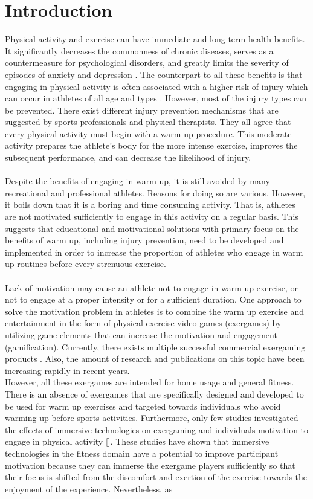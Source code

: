 \chapter{Introduction}
\label{chap:intro}
Physical activity and exercise can have immediate and long-term health benefits. It significantly decreases the commonness of chronic diseases, serves as a countermeasure for psychological disorders, and greatly limits the severity of episodes of anxiety and depression \cite{mayr2015prevention, warburton2006health}. The counterpart to all these benefits is that engaging in physical activity is often associated with a higher risk of injury which can occur in athletes of all age and types \cite{van1997severity}. However, most of the injury types can be prevented. There exist different injury prevention mechanisms that are suggested by sports professionals and physical therapists. They all agree that every physical activity must begin with a warm up procedure.  This moderate activity prepares the athlete's body for the more intense exercise, improves the subsequent performance, and can decrease the likelihood of injury. \\\\Despite the benefits of engaging in warm up, it is still avoided by many recreational and professional athletes. Reasons for doing so are various. However, it boils down that it is a boring and time consuming activity. That is, athletes are not motivated sufficiently to engage in this activity on a regular basis. This suggests that educational and motivational solutions with primary focus on the benefits of warm up, including injury prevention, need to be developed and implemented in order to increase the proportion of athletes who engage in warm up routines before every strenuous exercise.\\\\  Lack of motivation may cause an athlete not to engage in warm up exercise, or not to engage at a proper intensity or for a sufficient duration. One approach to solve the motivation problem in athletes is to combine the warm up exercise and entertainment in the form of physical exercise video games (exergames) by utilizing game elements that can increase the motivation and engagement (gamification). Currently, there exists multiple successful commercial exergaming products \cite{wii, dance}. Also, the amount of research and publications on this topic have  been increasing rapidly in recent years.\\ However, all these exergames are intended for home usage and general fitness. There is an absence of exergames that are specifically designed and developed to be used for warm up exercises and targeted towards individuals who avoid warming up before sports activities. Furthermore, only few studies investigated the effects of immersive technologies on exergaming and individuals motivation to engage in physical activity []. These studies have shown that immersive technologies in the fitness domain have a potential to improve participant motivation because they can immerse the exergame players sufficiently so that their focus is shifted from the discomfort and exertion of the exercise towards the enjoyment of the experience. Nevertheless, as 